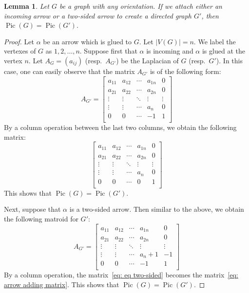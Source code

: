 \documentclass[11pt,reqno]{amsart}
\DeclareMathOperator{\Pic}{Pic}
\theoremstyle{definition}
\theoremstyle{plain}
\newtheorem{lem}[mydef]{\textbf{Lemma}}
\begin{document}
	\begin{lem}
		Let $G$ be a graph with any orientation. If we attach either an incoming arrow or a two-sided
		arrow to create a directed graph $G'$, then $\Pic(G)=\Pic(G')$. \label{proposition: gluing an arrow proposition}
	\end{lem}
	\begin{proof}
		Let $\alpha$ be an arrow which is glued to $G$. Let $|V(G)|=n$. We label the vertexes of
		$G$ as $1,2,\dots,n$. Suppose first that $\alpha$ is incoming and $\alpha$ is glued at the vertex $n$.
		Let $A_G=(a_{ij})$ (resp.~$A_{G'}$) be the Laplacian of $G$ (resp.~$G'$). In this case, one can easily
		observe that the matrix $A_{G'}$ is of the following form:
		\begin{equation}
			A_{G'}=\left[\begin{array}{ccc|c|c}
				a_{11}&a_{12}&\cdots &a_{1n}&0\\
				a_{21}&a_{22}&\cdots &a_{2n}&0\\
				\vdots & \vdots &\ddots & \vdots & \vdots \\ \hline
					\vdots & \vdots & \cdots&a_n & 0\\ \hline
				0&0&\cdots &-1&1\\
			\end{array}\right]
		\end{equation}
		By a column operation between the last two columns, we obtain the following matrix:
		\begin{equation}\label{eq: arrow adding matrix}
			\left[\begin{array}{ccc|c|c}
				a_{11}&a_{12}&\cdots &a_{1n}&0\\
				a_{21}&a_{22}&\cdots &a_{2n}&0\\
				\vdots & \vdots &\ddots & \vdots & \vdots \\ \hline
				\vdots & \vdots & \cdots&a_n & 0\\ \hline
				0&0&\cdots &0&1\\
			\end{array}\right]
		\end{equation}
		This shows that $\Pic(G)=\Pic(G')$.

		Next, suppose that $\alpha$ is a two-sided arrow. Then similar to the above, we obtain the following matroid for $G'$:
		\begin{equation}\label{eq: eq two-sided}
			A_{G'}=\left[\begin{array}{ccc|c|c}
				a_{11}&a_{12}&\cdots &a_{1n}&0\\
				a_{21}&a_{22}&\cdots &a_{2n}&0\\
				\vdots & \vdots &\ddots & \vdots & \vdots \\ \hline
				\vdots & \vdots & \cdots&a_n+1 & -1\\ \hline
				0&0&\cdots &-1&1\\
			\end{array}\right]
		\end{equation}
		By a column operation, the matrix~\eqref{eq: eq two-sided} becomes the matrix~\eqref{eq: arrow adding matrix}.
		This shows that $\Pic(G)=\Pic(G')$.
	\end{proof}
\end{document}
